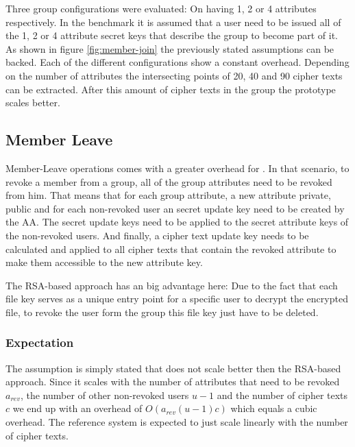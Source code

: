 Three group configurations were evaluated: On having 1, 2 or 4 attributes respectively. In the benchmark it is assumed that a user need to be issued all of the 1, 2 or 4 attribute secret keys that describe the group to become part of it. As shown in figure \ref{fig:member-join} the previously stated assumptions can be backed. Each of the different \name configurations show a constant overhead. Depending on the number of attributes the intersecting points of 20, 40 and 90 cipher texts can be extracted. After this amount of cipher texts in the group the prototype scales better.

\subsection{Member Leave}
Member-Leave operations comes with a greater overhead for \name. In that scenario, to revoke a member from a group, all of the group attributes need to be revoked from him. That means that for each group attribute, a new attribute private, public and for each non-revoked user an secret update key need to be created by the AA. The secret update keys need to be applied to the secret attribute keys of the non-revoked users. And finally, a cipher text update key needs to be calculated and applied to all cipher texts that contain the revoked attribute to make them accessible to the new attribute key.

The RSA-based approach has an big advantage here: Due to the fact that each file key serves as a unique entry point for a specific user to decrypt the encrypted file, to revoke the user form the group this file key just have to be deleted. 

\subsubsection{Expectation}
The assumption is simply stated that \name does not scale better then the RSA-based approach. Since it scales with the number of attributes that need to be revoked $a_{rev}$, the number of other non-revoked users $u-1$ and the number of cipher texts $c$ we end up with an overhead of $O(a_{rev}(u-1)c)$ which equals a cubic overhead. The reference system is expected to just scale linearly with the number of cipher texts. 

